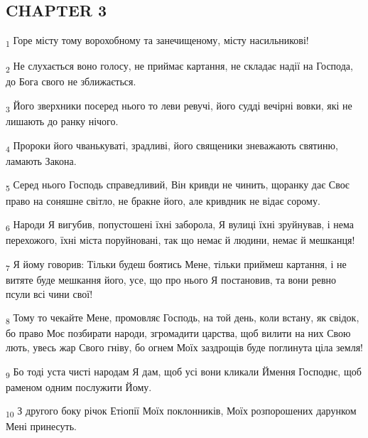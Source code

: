 \subsection{CHAPTER 3}
\begin{tcolorbox}
\textsubscript{1} Горе місту тому ворохобному та занечищеному, місту насильникові!
\end{tcolorbox}
\begin{tcolorbox}
\textsubscript{2} Не слухається воно голосу, не приймає картання, не складає надії на Господа, до Бога свого не зближається.
\end{tcolorbox}
\begin{tcolorbox}
\textsubscript{3} Його зверхники посеред нього то леви ревучі, його судді вечірні вовки, які не лишають до ранку нічого.
\end{tcolorbox}
\begin{tcolorbox}
\textsubscript{4} Пророки його чванькуваті, зрадливі, його священики зневажають святиню, ламають Закона.
\end{tcolorbox}
\begin{tcolorbox}
\textsubscript{5} Серед нього Господь справедливий, Він кривди не чинить, щоранку дає Своє право на соняшне світло, не бракне його, але кривдник не відає сорому.
\end{tcolorbox}
\begin{tcolorbox}
\textsubscript{6} Народи Я вигубив, попустошені їхні заборола, Я вулиці їхні зруйнував, і нема перехожого, їхні міста поруйновані, так що немає й людини, немає й мешканця!
\end{tcolorbox}
\begin{tcolorbox}
\textsubscript{7} Я йому говорив: Тільки будеш боятись Мене, тільки приймеш картання, і не витяте буде мешкання його, усе, що про нього Я постановив, та вони ревно псули всі чини свої!
\end{tcolorbox}
\begin{tcolorbox}
\textsubscript{8} Тому то чекайте Мене, промовляє Господь, на той день, коли встану, як свідок, бо право Моє позбирати народи, згромадити царства, щоб вилити на них Свою лють, увесь жар Свого гніву, бо огнем Моїх заздрощів буде поглинута ціла земля!
\end{tcolorbox}
\begin{tcolorbox}
\textsubscript{9} Бо тоді уста чисті народам Я дам, щоб усі вони кликали Ймення Господнє, щоб раменом одним послужити Йому.
\end{tcolorbox}
\begin{tcolorbox}
\textsubscript{10} З другого боку річок Етіопії Моїх поклонників, Моїх розпорошених дарунком Мені принесуть.
\end{tcolorbox}
